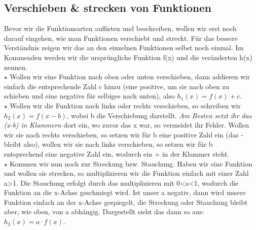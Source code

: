 \subsection{Verschieben \& strecken von Funktionen}
Bevor wir die Funktionsarten auflisten und beschreiben, wollen wir erst noch darauf eingehen, wie man Funktionen verschiebt und streckt. Für das bessere Verständnis zeigen wir das an den einzelnen Funktionen selbst noch einmal. Im Kommenden werden wir die ursprüngliche Funktion f(x) und die veränderten h(x) nennen.\\
\(\star\) Wollen wir eine Funktion nach oben oder unten verschieben, dann addieren wir einfach die entsprechende Zahl c hinzu (eine positive, um sie nach oben zu schieben und eine negative für selbiges nach unten), also \(h_1(x)=f(x)+c\).\\
\(\star\) Wollen wir die Funktion nach links oder rechts verschieben, so schreiben wir \(h_2(x)=f(x-b)\), wobei b die Verschiebung darstellt. \textit{Am Besten setzt ihr das (x-b) in Klammern} dort ein, wo zuvor das x war, so vermeidet ihr Fehler. Wollen wir sie nach rechts verschieben, so setzen wir für b eine positive Zahl ein (das - bleibt also), wollen wir sie nach links verschieben, so setzen wir für b entsprechend eine negative Zahl ein, wodurch ein + in der Klammer steht.\\
\(\star\) Kommen wir nun noch zur Streckung bzw. Stauchung. Haben wir eine Funktion und wollen sie strecken, so multiplizieren wir die Funktion einfach mit einer Zahl a>1. Die Stauchung erfolgt durch das multiplizieren mit 0<a<1, wodurch die Funktion an die x-Achse geschmiegt wird. Ist unser a negativ, dann wird unsere Funktion einfach an der x-Achse gespiegelt, die Streckung oder Stauchung bleibt aber, wie oben, von a abhängig. Dargestellt sieht das dann so aus: \(h_3(x)=a\cdot f(x)\).
